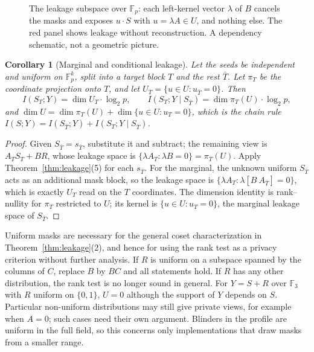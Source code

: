 \documentclass[pdflatex,sn-mathphys-num]{sn-jnl}%
\theoremstyle{plain}
\newtheorem{corollary}[theorem]{Corollary}
\theoremstyle{definition}
\newcommand{\F}{\mathbb{F}}
\begin{document}
\begin{figure}[t]
\centering
\figbox{}
\caption{The leakage subspace over $\mathbb F_p$: each left-kernel vector $\lambda$ of $B$ cancels the masks and exposes $u\cdot S$ with $u=\lambda A\in U$, and nothing else. The red panel shows leakage without reconstruction. A dependency schematic, not a geometric picture.}\label{fig:leakage}
\end{figure}

\begin{corollary}[Marginal and conditional leakage]\label{cor:condleak}
Let the seeds be independent and uniform on $\F_p^k$, split into a target block $T$ and the rest $\bar T$. Let $\pi_T$ be the coordinate projection onto $T$, and let $U_{T}=\{u\in U:u_{\bar T}=0\}$. Then
\[
 I(S_T;Y)=\dim U_T\cdot\log_2p,\qquad I(S_T;Y\mid S_{\bar T})=\dim\pi_T(U)\cdot\log_2p,
\]
and $\dim U=\dim\pi_T(U)+\dim\{u\in U:u_T=0\}$, which is the chain rule $I(S;Y)=I(S_{\bar T};Y)+I(S_T;Y\mid S_{\bar T})$.
\end{corollary}
\begin{proof}
Given $S_{\bar T}=s_{\bar T}$, substitute it and subtract; the remaining view is $A_TS_T+BR$, whose leakage space is $\{\lambda A_T:\lambda B=0\}=\pi_T(U)$. Apply Theorem~\ref{thm:leakage}(5) for each $s_{\bar T}$. For the marginal, the unknown uniform $S_{\bar T}$ acts as an additional mask block, so the leakage space is $\{\lambda A_T:\lambda[B\ A_{\bar T}]=0\}$, which is exactly $U_T$ read on the $T$ coordinates. The dimension identity is rank--nullity for $\pi_T$ restricted to $U$; its kernel is $\{u\in U:u_T=0\}$, the marginal leakage space of $S_{\bar T}$.
\end{proof}

Uniform masks are necessary for the general coset characterization in Theorem~\ref{thm:leakage}(2), and hence for using the rank test as a privacy criterion without further analysis. If $R$ is uniform on a subspace spanned by the columns of $C$, replace $B$ by $BC$ and all statements hold. If $R$ has any other distribution, the rank test is no longer sound in general. For $Y=S+R$ over $\F_3$ with $R$ uniform on $\{0,1\}$, $U=0$ although the support of $Y$ depends on $S$. Particular non-uniform distributions may still give private views, for example when $A=0$; such cases need their own argument. Blinders in the profile are uniform in the full field, so this concerns only implementations that draw masks from a smaller range.
\end{document}
